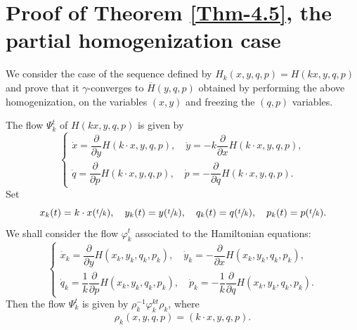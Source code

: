 \documentclass[JEP,XML,SOM,NoFloatCountersInSection,Unicode,published]{cedram}
\numberwithin{equation}{section}
\theoremstyle{plain}
\theoremstyle{definition}
\theoremstyle{remark}
\begin{document}
\section{Proof of Theorem \ref{Thm-4.5}, the partial homogenization case}

We consider the case of the sequence defined by $H_k(x,y,q,p)=H(kx,y,q, p)$ and prove that it $\gamma$-converges to
${\overline H}(y,q, p)$ obtained by performing the above homogenization, on the variables $(x,y)$ and freezing the $(q,p)$ variables.

The flow $\Psi_k^t$ of $H(kx,y,q,p)$ is given by
\[
\begin{cases}
\dot x= \dfrac{\partial}{\partial y}H(k\cdot x,y,q, p),\quad
\dot y=- k \dfrac{\partial}{\partial x}H(k\cdot x,y,q, p),\\[8pt]
\dot q= \dfrac{\partial}{\partial p}H(k\cdot x,y,q, p),\quad
\dot p=- \dfrac{\partial}{\partial q}H(k\cdot x,y,q, p).
\end{cases}
\]
Set
\[
x_{k}(t)=k\cdot x(\sfrac{t}{k}),\quad y_{k}(t)=y(\sfrac{t}{k}),\quad q_{k}(t)=q(\sfrac{t}{k}),\quad p_{k}(t)=p(\sfrac{t}{k}).
\]
We shall consider the flow $\varphi_{k}^t$ associated to the Hamiltonian equations:
\[
\begin{cases}
\dot x_{k}= \dfrac{\partial}{\partial y}H(x_{k},y_{k},q_{k},p_{k}),\quad
\dot y_{k}=- \dfrac{\partial}{\partial x}H(x_{k},y_{k},q_{k},p_{k}),\\[8pt]
\dot q_{k}= \dfrac{1}{k} \dfrac{\partial}{\partial p}H(x_{k},y_{k},q_{k},p_{k}),\quad
\dot p_{k}=-\dfrac{1}{k} \dfrac{\partial}{\partial q}H(x_{k},y_{k},q_{k},p_{k}).
\end{cases}
\]
Then the flow $\Psi_k^t$ is given by $\rho_{k}^{-1}\varphi_{k}^{kt}\rho_{k}$, where
\[
\rho_{k}(x,y,q,p)=(k\cdot x,y,q,p).
\]
\end{document}
